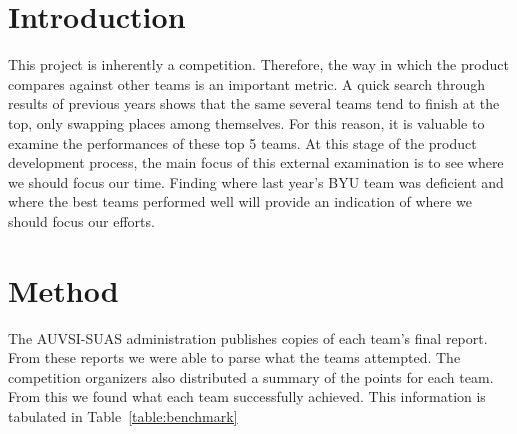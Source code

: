 \documentclass[]{auvsi_doc}
\begin{document}

\begin{AUVSITitlePage}
\begin{artifacttable}
\end{artifacttable}
\end{AUVSITitlePage}
\section{Introduction}

This project is inherently a competition. Therefore, the way in which the product compares against other teams is an important metric.  A quick search through results of previous years shows that the same several teams tend to finish at the top, only swapping places among themselves. For this reason, it is valuable to examine the performances of these top 5 teams. At this stage of the product development process, the main focus of this external examination is to see where we should focus our time. Finding where last year's BYU team was deficient and where the best teams performed well will provide an indication of where we should focus our efforts.

\section{Method}
The AUVSI-SUAS administration publishes copies of each team's final report. From these reports we were able to parse what the teams attempted. The competition organizers also distributed a summary of the points for each team. From this we found what each team successfully achieved. This information is tabulated in Table~\ref{table:benchmark}
\end{document}
